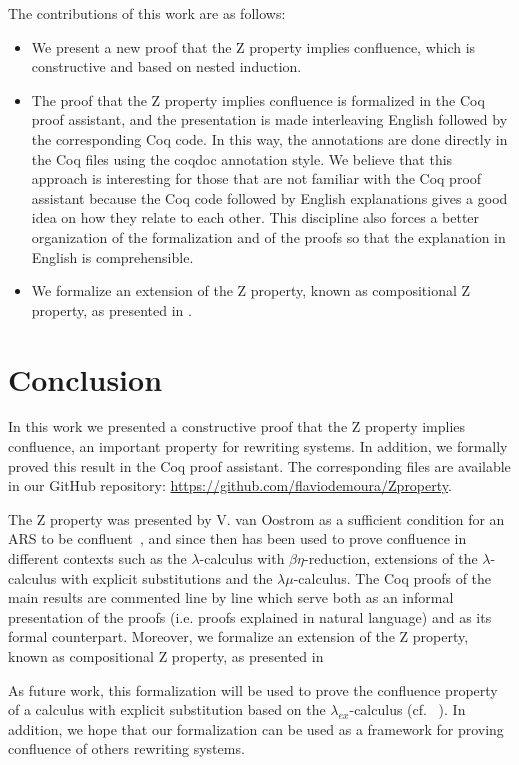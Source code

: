 \documentclass{entcs}
\begin{document}
The contributions of this work are as follows:
\begin{itemize}
\item We present a new proof that the Z property implies confluence,
  which is constructive and based on nested induction.
\item The proof that the Z property implies confluence is formalized
  in the Coq proof assistant, and the presentation is made
  interleaving English followed by the corresponding Coq code. In this
  way, the annotations are done directly in the Coq files using the
  coqdoc annotation style. We believe that this approach is
  interesting for those that are not familiar with the Coq proof
  assistant because the Coq code followed by English explanations
  gives a good idea on how they relate to each other. This discipline
  also forces a better organization of the formalization and of the
  proofs so that the explanation in English is comprehensible.
\item We formalize an extension of the Z property, known as
  compositional Z property, as presented in
  \cite{Nakazawa-Fujita2016}.
\end{itemize}




\section{Conclusion}

In this work we presented a constructive proof that the Z property
implies confluence, an important property for rewriting systems. In
addition, we formally proved this result in the Coq proof
assistant. The corresponding files are available in our GitHub
repository: \url{https://github.com/flaviodemoura/Zproperty}.

The Z property was presented by V. van Oostrom as a sufficient
condition for an ARS to be confluent~\cite{zproperty}, and since
then has been used to prove confluence in different contexts such as
the $\lambda$-calculus with $\beta\eta$-reduction, extensions of the
$\lambda$-calculus with explicit substitutions and the
$\lambda\mu$-calculus. The Coq proofs of the main results are
commented line by line which serve both as an informal presentation of
the proofs (i.e. proofs explained in natural language) and as its
formal counterpart. Moreover, we formalize an extension of the Z
property, known as compositional Z property, as presented in
\cite{Nakazawa-Fujita2016}

As future work, this formalization will be used to prove the
confluence property of a calculus with explicit substitution based on
the $\lambda_{ex}$-calculus (cf. ~\cite{kes09}). In addition, we hope
that our formalization can be used as a framework for proving
confluence of others rewriting systems.



\end{document}
